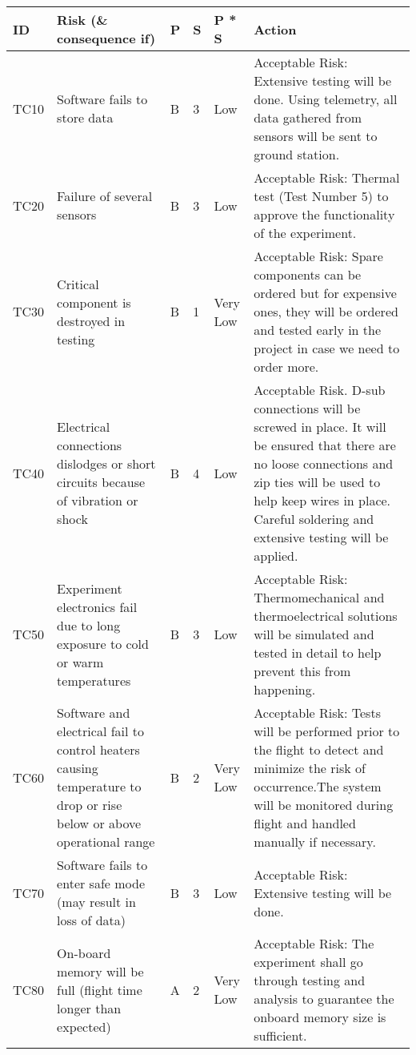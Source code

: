 


\begin{longtable}{|m{}| m{} |m{} |m{}|m{}| m{}|}

\hline
\textbf{ID} & \textbf{Risk (\& consequence if)} & \textbf{P} & \textbf{S} & \textbf{P * S} & \textbf{Action} \\ \hline
TC10 & Software fails to store data & B & 3 & \cellcolor[HTML]{FCFF2F}Low & Acceptable Risk: Extensive testing will be done. Using telemetry, all data gathered from sensors will be sent to ground station. \\ \hline
TC20 & Failure of several sensors & B & 3 & \cellcolor[HTML]{FCFF2F}Low & Acceptable Risk: Thermal test (Test Number 5) to approve the functionality of the experiment. \\ \hline
TC30 & Critical component is destroyed in testing & B & 1 & \cellcolor[HTML]{34FF34}Very Low & Acceptable Risk: Spare components can be ordered but for expensive ones, they will be ordered and tested early in the project in case we need to order more. \\ \hline
TC40 & Electrical connections dislodges or short circuits because of vibration or shock & B & 4 & \cellcolor[HTML]{FCFF2F}Low & Acceptable Risk. D-sub connections will be screwed in place. It will be ensured that there are no loose connections and zip ties will be used to help keep wires in place. Careful soldering and extensive testing will be applied. \\ \hline
TC50 & Experiment electronics fail due to long exposure to cold or warm temperatures & B & 3 & \cellcolor[HTML]{FCFF2F}Low & Acceptable Risk: Thermomechanical and thermoelectrical solutions will be simulated and tested in detail to help prevent this from happening. \\ \hline
TC60 & Software and electrical fail to control heaters causing temperature to drop or rise below or above operational range & B & 2 & \cellcolor[HTML]{34FF34}Very Low & Acceptable Risk: Tests will be performed prior to the flight to detect and minimize the risk of occurrence.The system will be monitored during flight and handled manually if necessary. \\ \hline
TC70 & Software fails to enter safe mode (may result in loss of data) & B & 3 & \cellcolor[HTML]{FCFF2F}Low & Acceptable Risk: Extensive testing will be done. \\ \hline
TC80 & On-board memory will be full (flight time longer than expected) & A & 2 & \cellcolor[HTML]{34FF34}Very Low & Acceptable Risk: The experiment shall go through testing and analysis to guarantee the onboard memory size is sufficient.\\ \hline

\end{longtable}
